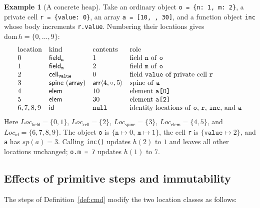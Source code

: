 \documentclass[10pt,a4paper]{article}
\theoremstyle{definition}
\newtheorem{example}[theorem]{Example}
\theoremstyle{remark}
\newcommand{\code}[1]{\texttt{#1}}
\newcommand{\kF}{\mathsf{field}}\newcommand{\kC}{\mathsf{cell}}\newcommand{\kE}{\mathsf{elem}}\newcommand{\kS}{\mathsf{spine}}\newcommand{\kI}{\mathsf{id}}
\newcommand{\LF}{\mathit{Loc}_{\kF}}\newcommand{\LC}{\mathit{Loc}_{\kC}}\newcommand{\LE}{\mathit{Loc}_{\kE}}\newcommand{\LS}{\mathit{Loc}_{\kS}}\newcommand{\LI}{\mathit{Loc}_{\kI}}
\begin{document}
\begin{example}[A concrete heap]\label{ex:heap}
Take an ordinary object \code{o = \{n: 1, m: 2\}}, a private cell
\code{r = \{value: 0\}}, an array \code{a = [10, , 30]}, and a function
object \code{inc} whose body increments \code{r.value}. Numbering their
locations gives $\mathrm{dom}\,h=\{0,\dots,9\}$:
{\small\begin{displaymath}
\begin{array}{@{}llll@{}}
\text{location} & \text{kind} & \text{contents} & \text{role}\\
0 & \kF_{\code{n}} & 1 & \text{field \code{n} of \code{o}}\\
1 & \kF_{\code{m}} & 2 & \text{field \code{m} of \code{o}}\\
2 & \kC_{\code{value}} & 0 & \text{field \code{value} of private cell \code{r}}\\
3 & \kS\ (\mathsf{array}) & \mathsf{arr}\langle 4,\circ,5\rangle & \text{spine of \code{a}}\\
4 & \kE & 10 & \text{element \code{a[0]}}\\
5 & \kE & 30 & \text{element \code{a[2]}}\\
6,7,8,9 & \kI & \code{null} & \text{identity locations of \code{o}, \code{r}, \code{inc}, and \code{a}}
\end{array}
\end{displaymath}}
Here $\LF=\{0,1\}$, $\LC=\{2\}$, $\LS=\{3\}$, $\LE=\{4,5\}$, and
$\LI=\{6,7,8,9\}$. The object \code{o} is $\{\code{n}\mapsto 0,\ \code{m}\mapsto 1\}$,
the cell \code{r} is $\{\code{value}\mapsto 2\}$, and \code{a} has
$\mathit{sp}(a)=3$. Calling \code{inc()} updates $h(2)$ to $1$ and
leaves all other locations unchanged; \code{o.m = 7} updates $h(1)$ to
$7$.
\end{example}

\subsection{Effects of primitive steps and immutability}

The steps of Definition~\ref{def:cmd} modify the two location classes as
follows:
\end{document}
